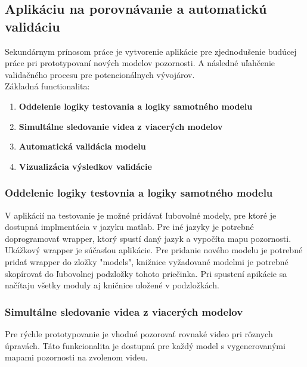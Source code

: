 \subsection{Aplikáciu na porovnávanie a automatickú validáciu}
Sekundárnym prínosom práce je vytvorenie aplikácie pre zjednodušenie budúcej práce pri prototypovaní nových modelov pozornosti.
A následné uľahčenie validačného procesu pre potencionálnych vývojárov.\\
Základná functionalita:
\begin{enumerate}
  \item\textbf{Oddelenie logiky testovania a logiky samotného modelu}
  \item\textbf{Simultálne sledovanie videa z viacerých modelov}
  \item\textbf{Automatická validácia modelu}
  \item\textbf{Vizualizácia výsledkov validácie}
\end{enumerate}

\subsubsection{Oddelenie logiky testovnia a logiky samotného modelu}
V aplikácií na testovanie je možné pridávať ľubovolné modely, pre ktoré je dostupná implmentácia v jazyku matlab.
Pre iné jazyky je potrebné doprogramovať wrapper, ktorý spustí daný jazyk a vypočíta mapu pozornosti.
Ukážkový wrapper je súčasťou aplikácie.
Pre pridanie nového modelu je potrebné pridať wrapper do zložky "models", knižnice vyžadované modelmi je potrebné skopírovať do ľubovolnej podzložky tohoto priečinka.
Pri spustení apikácie sa načítaju všetky moduly aj kničnice uložené v podzložkách.

\subsubsection{Simultálne sledovanie videa z viacerých modelov}
Pre rýchle prototypovanie je vhodné pozorovať rovnaké video pri rôznych úpravách.
Táto funkcionalita je dostupná pre každý model s vygenerovanými mapami pozornosti na zvolenom videu.

